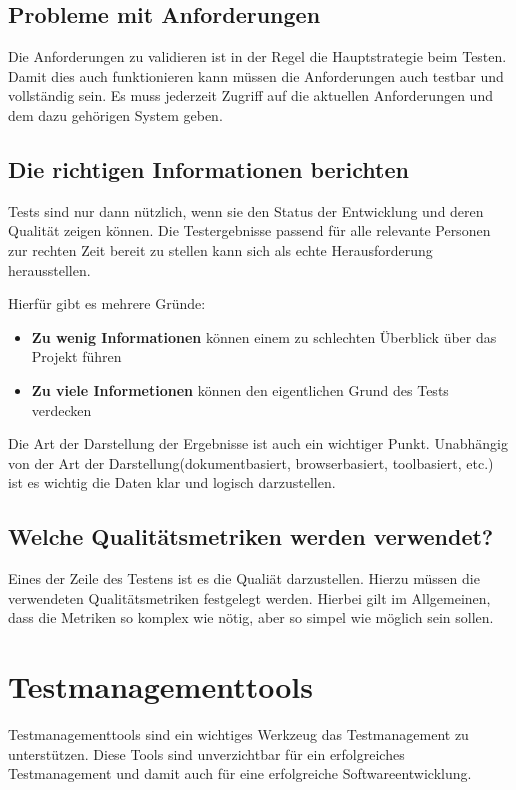 \section{Probleme mit Anforderungen}
Die Anforderungen zu validieren ist in der Regel die Hauptstrategie beim Testen. Damit dies auch funktionieren kann m\"ussen die Anforderungen auch testbar und vollst\"andig sein. Es muss jederzeit Zugriff auf die aktuellen Anforderungen und dem dazu geh\"origen System geben. 

\section{Die richtigen Informationen berichten}
Tests sind nur dann n\"utzlich, wenn sie den Status der Entwicklung und deren Qualit\"at zeigen k\"onnen. Die Testergebnisse passend f\"ur alle relevante Personen zur rechten Zeit bereit zu stellen kann sich als echte Herausforderung herausstellen. 

Hierf\"ur gibt es mehrere Gr\"unde:
\begin{itemize}
	\item \textbf{Zu wenig Informationen} k\"onnen einem zu schlechten \"Uberblick \"uber das Projekt f\"uhren
	\item \textbf{Zu viele Informetionen} k\"onnen den eigentlichen Grund des Tests verdecken
\end{itemize}

Die Art der Darstellung der Ergebnisse ist auch ein wichtiger Punkt. Unabh\"angig von der Art der Darstellung(dokumentbasiert, browserbasiert, toolbasiert, etc.) ist es wichtig die Daten klar und logisch darzustellen.

\section{Welche Qualit\"atsmetriken werden verwendet?}
Eines der Zeile des Testens ist es die Quali\"at darzustellen. Hierzu m\"ussen die verwendeten Qualit\"atsmetriken festgelegt werden. Hierbei gilt im Allgemeinen, dass die Metriken so komplex wie n\"otig, aber so simpel wie m\"oglich sein sollen.

\chapter{Testmanagementtools}
Testmanagementtools sind ein wichtiges Werkzeug das Testmanagement zu unterst\"utzen. Diese Tools sind unverzichtbar f\"ur ein erfolgreiches Testmanagement und damit auch f\"ur eine erfolgreiche Softwareentwicklung.


